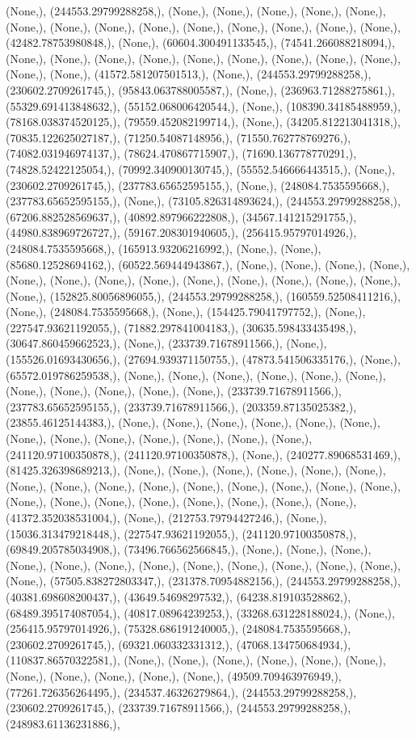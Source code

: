 \documentclass{article}
\begin{document}
(None,), (244553.29799288258,), (None,), (None,), (None,), (None,), (None,), (None,), (None,), (None,), (None,), (None,), (None,), (None,), (None,), (None,), (42482.78753980848,), (None,), (60604.300491133545,), (74541.266088218094,), (None,), (None,), (None,), (None,), (None,), (None,), (None,), (None,), (None,), (None,), (None,), (41572.581207501513,), (None,), (244553.29799288258,), (230602.2709261745,), (95843.063788005587,), (None,), (236963.71288275861,), (55329.691413848632,), (55152.068006420544,), (None,), (108390.34185488959,), (78168.038374520125,), (79559.452082199714,), (None,), (34205.812213041318,), (70835.122625027187,), (71250.54087148956,), (71550.762778769276,), (74082.031946974137,), (78624.470867715907,), (71690.136778770291,), (74828.52422125054,), (70992.340900130745,), (55552.546666443515,), (None,), (230602.2709261745,), (237783.65652595155,), (None,), (248084.7535595668,), (237783.65652595155,), (None,), (73105.826314893624,), (244553.29799288258,), (67206.882528569637,), (40892.897966222808,), (34567.141215291755,), (44980.838969726727,), (59167.208301940605,), (256415.95797014926,), (248084.7535595668,), (165913.93206216992,), (None,), (None,), (85680.12528694162,), (60522.569444943867,), (None,), (None,), (None,), (None,), (None,), (None,), (None,), (None,), (None,), (None,), (None,), (None,), (None,), (None,), (152825.80056896055,), (244553.29799288258,), (160559.52508411216,), (None,), (248084.7535595668,), (None,), (154425.79041797752,), (None,), (227547.93621192055,), (71882.297841004183,), (30635.598433435498,), (30647.860459662523,), (None,), (233739.71678911566,), (None,), (155526.01693430656,), (27694.939371150755,), (47873.541506335176,), (None,), (65572.019786259538,), (None,), (None,), (None,), (None,), (None,), (None,), (None,), (None,), (None,), (None,), (None,), (233739.71678911566,), (237783.65652595155,), (233739.71678911566,), (203359.87135025382,), (23855.46125144383,), (None,), (None,), (None,), (None,), (None,), (None,), (None,), (None,), (None,), (None,), (None,), (None,), (None,), (241120.97100350878,), (241120.97100350878,), (None,), (240277.89068531469,), (81425.326398689213,), (None,), (None,), (None,), (None,), (None,), (None,), (None,), (None,), (None,), (None,), (None,), (None,), (None,), (None,), (None,), (None,), (None,), (None,), (None,), (None,), (None,), (None,), (None,), (41372.352038531004,), (None,), (212753.79794427246,), (None,), (15036.313479218448,), (227547.93621192055,), (241120.97100350878,), (69849.205785034908,), (73496.766562566845,), (None,), (None,), (None,), (None,), (None,), (None,), (None,), (None,), (None,), (None,), (None,), (None,), (None,), (57505.838272803347,), (231378.70954882156,), (244553.29799288258,), (40381.698608200437,), (43649.54698297532,), (64238.819103528862,), (68489.395174087054,), (40817.08964239253,), (33268.631228188024,), (None,), (256415.95797014926,), (75328.686191240005,), (248084.7535595668,), (230602.2709261745,), (69321.060332331312,), (47068.134750684934,), (110837.86570322581,), (None,), (None,), (None,), (None,), (None,), (None,), (None,), (None,), (None,), (None,), (None,), (49509.709463976949,), (77261.726356264495,), (234537.46326279864,), (244553.29799288258,), (230602.2709261745,), (233739.71678911566,), (244553.29799288258,), (248983.61136231886,), 
\end{document}
